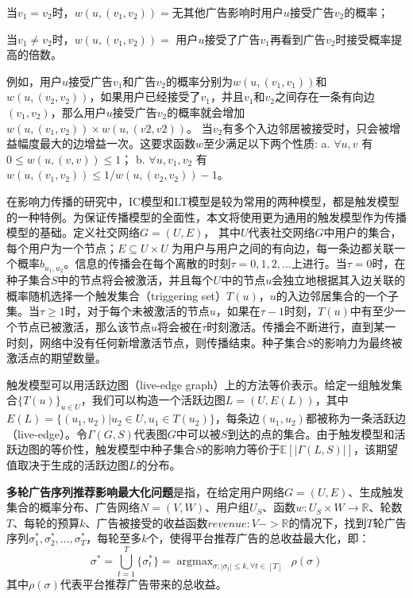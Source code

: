 当$v_1=v_2$时，$w(u,(v_1,v_2))=$无其他广告影响时用户$u$接受广告$v_2$的概率；

当$v_1\ne v_2$时，$w(u,(v_1,v_2))=$ 用户$u$接受了广告$v_1$再看到广告$v_2$时接受概率提高的倍数。


例如，用户$u$接受广告$v_1$和广告$v_2$的概率分别为$w(u,(v_1,v_1))$和$w(u,(v_2,v_2))$，如果用户已经接受了$v_1$，并且$v_1$和$v_2$之间存在一条有向边$(v_1,v_2)$，那么用户$u$接受广告$v_2$的概率就会增加$w(u,(v_1,v_2)) \times w(u,(v2,v2))$。 当$v_2$有多个入边邻居被接受时，只会被增益幅度最大的边增益一次。这要求函数$w$至少满足以下两个性质:
a. $ \forall u,v$ 有 $0\le w(u,(v,v))\le 1 $；
b. $\forall u,v_1,v_2$ 有$w(u,(v_1,v_2))\le 1/w(u,(v_2,v_2))-1$。

在影响力传播的研究中，IC模型和LT模型是较为常用的两种模型，都是触发模型的一种特例\cite{kempe2003maximizing}。为保证传播模型的全面性，本文将使用更为通用的触发模型作为传播模型的基础。定义社交网络$G=(U,E)$， 其中$U$代表社交网络$G$中用户的集合，每个用户为一个节点；$E\subseteq U\times U$ 为用户与用户之间的有向边，每一条边都关联一个概率$b_{u_1,u_2}$。信息的传播会在每个离散的时刻$\tau =0,1,2, ...$上进行。当$\tau = 0$时，在种子集合$S$中的节点将会被激活，并且每个$U$中的节点$u$会独立地根据其入边关联的概率随机选择一个触发集合（triggering set）$T(u)$，$u$的入边邻居集合的一个子集。当$\tau \ge 1$时，对于每个未被激活的节点$u$，如果在$\tau -1$时刻，$T(u)$中有至少一个节点已被激活，那么该节点$u$将会被在$\tau$时刻激活。传播会不断进行，直到某一时刻，网络中没有任何新增激活节点，则传播结束。种子集合$S$的影响力为最终被激活点的期望数量。

触发模型可以用活跃边图（live-edge graph）上的方法等价表示。给定一组触发集合$\{T(u)\}_{u\in U}$，我们可以构造一个活跃边图$L=(U,E(L))$，其中$E(L)=\{(u_1,u_2)|u_2\in U, u_1\in T(u_2)\}$，每条边$(u_1,u_2)$都被称为一条活跃边（live-edge）。令$\Gamma(G,S)$代表图$G$中可以被$S$到达的点的集合。由于触发模型和活跃边图的等价性，触发模型中种子集合$S$的影响力等价于$\mathbb{E}[|\Gamma(L,S)|]$，该期望值取决于生成的活跃边图$L$的分布。
\begin{definition}
{\bfseries 多轮广告序列推荐影响最大化问题}是指，在给定用户网络$G=(U,E)$、生成触发集合的概率分布、广告网络$N = (V, W)$、用户组$U_S$、函数$w:U_S \times W \to \mathbb{R}$、轮数$T$、每轮的预算$k$、广告被接受的收益函数$revenue:V->\mathbb{R}$的情况下，找到$T$轮广告序列$\sigma_1^*,\sigma_2^*,...,\sigma_T^*$，每轮至多$k$个，使得平台推荐广告的总收益最大化，即：
\begin{equation}
\sigma^* = \bigcup _{t=1} ^T \{\sigma_t^*\} = \mathop{\arg\max}_{\sigma:|\sigma_t|\le k,\forall t \in[T]} \ \ \rho(\sigma)
\end{equation}
\noindent 其中$\rho(\sigma)$代表平台推荐广告带来的总收益。
\end{definition}

